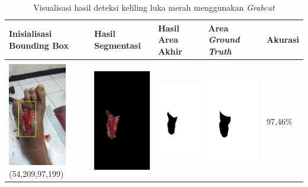 \begin{table}[H]
	\centering
	\caption{Visualisasi hasil deteksi keliling luka merah menggunakan \emph{Grabcut}}
	\label{tabel_hasil_11}
	\begin{tabular}{|m{1.0in}|m{1.0in}|m{1.0in}|m{1.0in}|m{0.6in}|}
		\hline
		\textbf{Inisialisasi Bounding Box} & \textbf{Hasil Segmentasi} & \textbf{Hasil Area Akhir} & \textbf{Area \emph{Ground Truth}} & \textbf{Akurasi} \\
		\hline

		&  &  & \\
		\includegraphics[width=1.0in]{gambar/hasil_segmentasi/luka_merah/image_2_rect.jpg} {\centering\fontsize{10}{10}\selectfont(54,209,97,199)}&
		\includegraphics[width=1.0in]{gambar/hasil_segmentasi/luka_merah/result_2.jpg}&
		\includegraphics[width=1.0in]{gambar/hasil_segmentasi/luka_merah/mask_r_2.jpg}&
		\includegraphics[width=1.0in]{gambar/hasil_segmentasi/luka_merah/2_r.jpg}&
		97,46\% \\
		\hline


\end{tabular}
\end{table}
